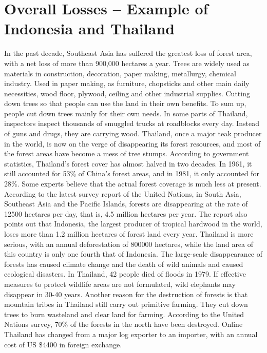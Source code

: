\documentclass{book}\usepackage{knitr}
\begin{document}
\section{Overall Losses – Example of Indonesia and Thailand}
In the past decade, Southeast Asia has suffered the greatest loss of forest area, with a net loss of more than 900,000 hectares a year. Trees are widely used as materials in construction, decoration, paper making, metallurgy, chemical industry. Used in paper making, as furniture, chopsticks and other main daily necessities, wood floor, plywood, ceiling and other industrial supplies. Cutting down trees so that people can use the land in their own benefits. To sum up, people cut down trees mainly for their own needs.
	In some parts of Thailand, inspectors inspect thousands of smuggled trucks at roadblocks every day. Instead of guns and drugs, they are carrying wood. Thailand, once a major teak producer in the world, is now on the verge of disappearing its forest resources, and most of the forest areas have become a mess of tree stumps. According to government statistics, Thailand's forest cover has almost halved in two decades. In 1961, it still accounted for 53\% of China's forest areas, and in 1981, it only accounted for 28\%. Some experts believe that the actual forest coverage is much less at present. According to the latest survey report of the United Nations, in South Asia, Southeast Asia and the Pacific Islands, forests are disappearing at the rate of 12500 hectares per day, that is, 4.5 million hectares per year. The report also points out that Indonesia, the largest producer of tropical hardwood in the world, loses more than 1.2 million hectares of forest land every year. Thailand is more serious, with an annual deforestation of 800000 hectares, while the land area of this country is only one fourth that of Indonesia. The large-scale disappearance of forests has caused climate change and the death of wild animals and caused ecological disasters. In Thailand, 42 people died of floods in 1979. If effective measures to protect wildlife areas are not formulated, wild elephants may disappear in 30-40 years. Another reason for the destruction of forests is that mountain tribes in Thailand still carry out primitive farming. They cut down trees to burn wasteland and clear land for farming. According to the United Nations survey, 70\% of the forests in the north have been destroyed. Online Thailand has changed from a major log exporter to an importer, with an annual cost of US \$4400 in foreign exchange.
\end{document}
